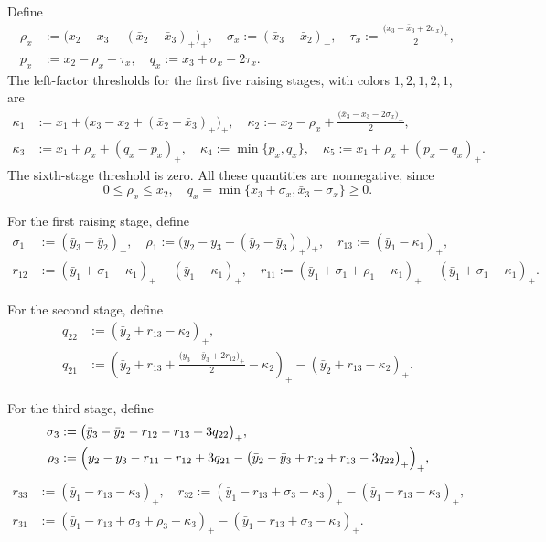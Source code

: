\documentclass[11pt,reqno]{amsart}
\numberwithin{table}{section}
\numberwithin{equation}{section}
\theoremstyle{plain}
\theoremstyle{definition}
\begin{document}
Define
\begin{align*}
	\rho_x
	&:=
	\bigl(
	x_2-x_3-(\bar x_2-\bar x_3)_+
	\bigr)_+,
	\quad
	\sigma_x
	:=
	(\bar x_3-\bar x_2)_+,
	\quad
	\tau_x
	:=
	\frac{
		\bigl(x_3-\bar x_3+2\sigma_x\bigr)_+
	}{2},
	\\
	p_x
	&:=
	x_2-\rho_x+\tau_x,
	\quad
	q_x
	:=
	x_3+\sigma_x-2\tau_x.
\end{align*}
The left-factor thresholds for the first five raising stages,
with colors \(1,2,1,2,1\), are
\begin{align*}
	\kappa_1
	&:=
	x_1+
	\bigl(
	x_3-x_2+(\bar x_2-\bar x_3)_+
	\bigr)_+,
	\quad
	\kappa_2
	:=
	x_2-\rho_x+
	\frac{
		\bigl(\bar x_3-x_3-2\sigma_x\bigr)_+
	}{2},
	\\
	\kappa_3
	&:=
	x_1+\rho_x+(q_x-p_x)_+,
	\quad
	\kappa_4
	:=
	\min\{p_x,q_x\},
	\quad
	\kappa_5
	:=
	x_1+\rho_x+(p_x-q_x)_+.
\end{align*}
The sixth-stage threshold is zero.
All these quantities are nonnegative, since
\[
0\le\rho_x\le x_2,
\quad
q_x
=
\min\{x_3+\sigma_x,\bar x_3-\sigma_x\}
\ge0.
\]

For the first raising stage, define
\begin{align*}
	\sigma_1
	&:=
	(\bar y_3-\bar y_2)_+,
	\quad
	\rho_1
	:=
	\bigl(
	y_2-y_3-(\bar y_2-\bar y_3)_+
	\bigr)_+,
	\quad
	r_{13}
	:=
	(\bar y_1-\kappa_1)_+,
	\\
	r_{12}
	&:=
	(\bar y_1+\sigma_1-\kappa_1)_+
	-
	(\bar y_1-\kappa_1)_+,
	\quad
	r_{11}
	:=
	(\bar y_1+\sigma_1+\rho_1-\kappa_1)_+
	-
	(\bar y_1+\sigma_1-\kappa_1)_+.
\end{align*}

For the second stage, define
\begin{align*}
	q_{22}
	&:=
	(\bar y_2+r_{13}-\kappa_2)_+,
	\\
	q_{21}
	&:=
	\left(
	\bar y_2+r_{13}
	+
	\frac{
		\bigl(y_3-\bar y_3+2r_{12}\bigr)_+
	}{2}
	-\kappa_2
	\right)_+
	-
	(\bar y_2+r_{13}-\kappa_2)_+.
\end{align*}

For the third stage, define
\begin{align*}
	\sigma_3
	&:=
	\bigl(
	\bar y_3-\bar y_2-r_{12}-r_{13}+3q_{22}
	\bigr)_+,
	\\
	\rho_3
	&:=
	\Bigl(
	y_2-y_3-r_{11}-r_{12}+3q_{21}
	-
	\bigl(
	\bar y_2-\bar y_3+r_{12}+r_{13}-3q_{22}
	\bigr)_+
	\Bigr)_+,
\end{align*}
\begin{align*}
	r_{33}
	&:=
	(\bar y_1-r_{13}-\kappa_3)_+,
	\quad
	r_{32}
	:=
	(\bar y_1-r_{13}+\sigma_3-\kappa_3)_+
	-
	(\bar y_1-r_{13}-\kappa_3)_+,
	\\
	r_{31}
	&:=
	(\bar y_1-r_{13}+\sigma_3+\rho_3-\kappa_3)_+
	-
	(\bar y_1-r_{13}+\sigma_3-\kappa_3)_+.
\end{align*}
\end{document}
